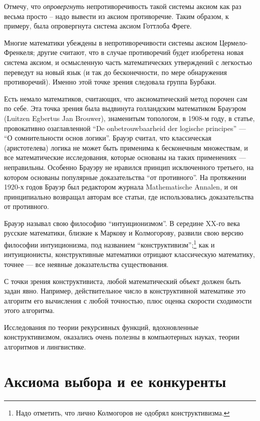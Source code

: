 \documentclass[12pt]{book}
\theoremstyle{upshape}
\theoremstyle{generic}
\theoremstyle{upshapenonumber}
\newcommand{\следствие}{%
     \refstepcounter{teorema}
     {\noindent\bf Следствие \thechapter.\arabic{teorema}:\ }}
\newcommand{\пример}{%
     \refstepcounter{teorema}
     {\noindent\bf Пример \thechapter.\arabic{teorema}:\ }}
\newcommand{\лемма}{%
     \refstepcounter{teorema}
     {\noindent\bf Лемма \thechapter.\arabic{teorema}:\ }}
\newcommand{\теорема}{%
     \refstepcounter{teorema}
     {\noindent\bf Теорема \thechapter.\arabic{teorema}:\ }}
\newcommand{\утверждение}{%
     \refstepcounter{teorema}
     {\noindent\bf Утверждение \thechapter.\arabic{teorema}:\ }}
\begin{document}
Отмечу, что {\em опровергнуть} непротиворечивость
такой системы аксиом как раз весьма просто --
надо вывести из аксиом противоречие. Таким образом,
к примеру, была опровергнута система аксиом Готтлоба Фреге.

Многие математики убеждены в 
непротиворечивости системы аксиом Цермело-Френкеля;
другие считают, что в случае противоречий
будет изобретена новая система аксиом,
и осмысленную часть математических утверждений
с легкостью переведут на новый язык 
(и так до бесконечности, по мере обнаружения
противоречий). Именно этой точке зрения
следовала группа Бурбаки.

Есть немало математиков, считающих, что
аксиоматический метод порочен сам по себе.
Эта точка зрения была выдвинута голландским математиком
Брауэром (Luitzen Egbertus Jan Brouwer), знаменитым
топологом, в 1908-м году, в статье, провокативно
озаглавленной ``De onbetrouwbaarheid der 
logische principes'' --- ``О сомнительности
основ логики''. Брауэр считал, что классическая
(аристотелева) логика не может быть применима
к бесконечным множествам, и все математические
исследования, которые основаны на таких
применениях --- неправильны.
Особенно Брауэру не нравился принцип исключенного
третьего, на котором основаны популярные
доказательства ``от противного''. На протяжении 1920-х
годов Брауэр был редактором журнала Mathematische Annalen,
и он принципиально возвращал авторам все статьи, где
использовались доказательства от противного.

Брауэр называл свою философию ``интуиционизмом''.
В середине XX-го века русские математики, близкие к 
Маркову и Колмогорову, развили свою версию философии 
интуиционизма, под названием 
``конструктивизм'';\footnote{Надо отметить, что
лично Колмогоров не одобрял конструктивизма.}
как и интуиционисты, конструктивные математики
отрицают классическую математику, точнее --- 
все неявные доказательства существования.

С точки зрения конструктивиста, любой математический
объект должен быть задан явно. Например, действительное
число в конструктивной математике это алгоритм его
вычисления с любой точностью, плюс оценка скорости 
сходимости этого алгоритма.


Исследования по теории рекурсивных функций,
вдохновленные конструктивизмом, оказались очень
полезны в компьютерных науках, теории алгоритмов
и лингвистике.



\section{Аксиома выбора и ее конкуренты}
\label{_AC_alterna_Section_}
\end{document}
